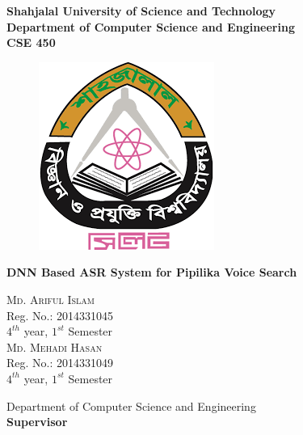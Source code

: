 \documentclass{standalone}
\begin{document}
\begin{titlepage}

\begin{center}
				{\huge \bf Shahjalal University of Science and Technology}\\
				{\LARGE \bf Department of Computer Science and Engineering}
                \\
                \vspace{15pt}
                {\LARGE \bf CSE 450}
				\vfill
        \begin{figure}[h]
				\centering
				\includegraphics[scale=0.6]{./img/varsityLogo}
				\end{figure}

				\vfill
				{\LARGE \bf DNN Based ASR System for Pipilika Voice Search }\\
        \begin{multicols}{2}
        
        \textsc{\large Md. Ariful Islam}\\
        Reg. No.: 2014331045\\ $4^{th}$ year, $1^{st}$ Semester\\			
                \textsc{\large Md. Mehadi Hasan}\\
        Reg. No.: 2014331049\\ $4^{th}$ year, $1^{st}$ Semester
				\end{multicols}
				Department of Computer Science and Engineering\\
				\vfill
        {\bf Supervisor}\\
				

\end{center}
\end{titlepage}
\end{document}
